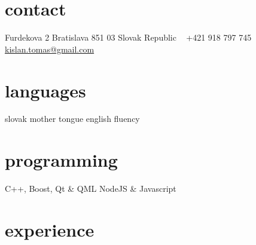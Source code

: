 \documentclass[]{friggeri-cv} %
\begin{document}


\begin{aside} %
\section{contact}
Furdekova 2
Bratislava 851 03
Slovak Republic
~
+421 918 797 745
~
\href{mailto:kislan.tomas@gmail.com}{kislan.tomas@gmail.com}
\section{languages}
slovak mother tongue
english fluency
\section{programming}
C++, Boost, Qt \& QML
NodeJS \& Javascript
\end{aside}


\section{experience}
\end{document}
